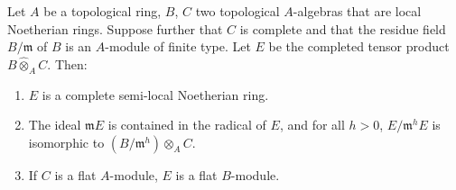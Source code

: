 \begin{lemma}[19.7.1.2]
\label{0.19.7.1.2}
Let $A$ be a topological ring, $B$, $C$ two topological $A$-algebras that are local Noetherian rings.
Suppose further that $C$ is complete and that the residue field $B/\mathfrak{m}$ of $B$ is an $A$-module of finite type.
Let $E$ be the completed tensor product $B\widehat{\otimes}_A C$.
Then:
\begin{enumerate}
  \item[\rm(i)] $E$ is a complete semi-local Noetherian ring.
  \item[\rm(ii)] The ideal $\mathfrak{m}E$ is contained in the radical of $E$, and for all $h>0$, $E/\mathfrak{m}^h E$ is isomorphic to $(B/\mathfrak{m}^h)\otimes_A C$.
  \item[\rm\textup{(iii)}] If $C$ is a flat $A$-module, $E$ is a flat $B$-module.
\end{enumerate}
\end{lemma}

